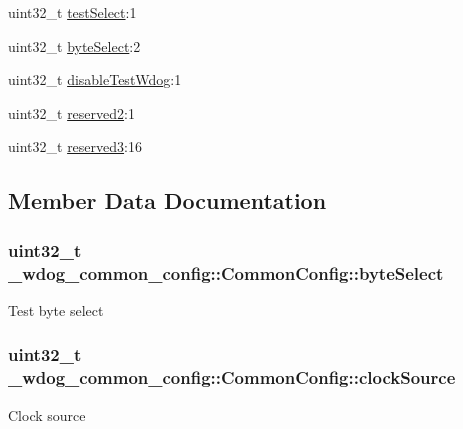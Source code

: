 \begin{DoxyCompactItemize}
\item 
uint32\+\_\+t \hyperlink{struct__wdog__common__config_1_1CommonConfig_a0cb7de988dfc16962c562f854721e8b4}{test\+Select}\+:1
\item 
uint32\+\_\+t \hyperlink{struct__wdog__common__config_1_1CommonConfig_abef7d0cc5b53c6eec014d024317e4126}{byte\+Select}\+:2
\item 
uint32\+\_\+t \hyperlink{struct__wdog__common__config_1_1CommonConfig_af06845eb5923dc98644c9c6a1a386b24}{disable\+Test\+Wdog}\+:1
\item 
uint32\+\_\+t \hyperlink{struct__wdog__common__config_1_1CommonConfig_aecd8bb352eb8548748b2d9f9fb231f9f}{reserved2}\+:1
\item 
uint32\+\_\+t \hyperlink{struct__wdog__common__config_1_1CommonConfig_a2d6a133fc6d53def313ae085d2cfa025}{reserved3}\+:16
\end{DoxyCompactItemize}


\subsection{Member Data Documentation}
\subsubsection[{\texorpdfstring{byte\+Select}{byteSelect}}]{\setlength{\rightskip}{0pt plus 5cm}uint32\+\_\+t \+\_\+wdog\+\_\+common\+\_\+config\+::\+Common\+Config\+::byte\+Select}\hypertarget{struct__wdog__common__config_1_1CommonConfig_abef7d0cc5b53c6eec014d024317e4126}{}\label{struct__wdog__common__config_1_1CommonConfig_abef7d0cc5b53c6eec014d024317e4126}
Test byte select 
\subsubsection[{\texorpdfstring{clock\+Source}{clockSource}}]{\setlength{\rightskip}{0pt plus 5cm}uint32\+\_\+t \+\_\+wdog\+\_\+common\+\_\+config\+::\+Common\+Config\+::clock\+Source}\hypertarget{struct__wdog__common__config_1_1CommonConfig_afcdbbe688f127173c963c7b2846ec353}{}\label{struct__wdog__common__config_1_1CommonConfig_afcdbbe688f127173c963c7b2846ec353}
Clock source 
